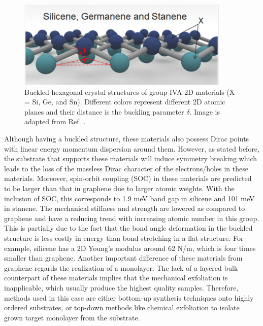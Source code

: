 \begin{figure}[htbp!] 
\centering  
\includegraphics[width=0.9\textwidth]{silicene_structure.png}
\caption[Group IVA 2D materials]{Buckled hexagonal crystal structures of group IVA 2D materials (X = Si, Ge, and Sn). Different colors represent different 2D atomic planes and their distance is the buckling parameter $\delta$. Image is adapted from Ref. \cite{Balendhran2015}.}  
\label{fig:silicene}
\end{figure} 


Although having a buckled structure, these materials also possess Dirac points with linear energy momentum dispersion around them\cite{Garcia2011}.  However, as stated before, the substrate that supports these materials will induce symmetry breaking which leads to the loss of the massless Dirac character of the electrons/holes\cite{Lin2013} in these materials. Moreover, spin-orbit coupling (SOC) in these materials are predicted to be larger than that in graphene due to larger atomic weights. With the inclusion of SOC, this corresponds to 1.9 meV band gap in silicene and 101 meV in stanene\cite{matthes2013}. The mechanical stiffness and strength are lowered as compared to graphene and have a reducing trend with increasing atomic number in this group. This is partially due to the fact that the bond angle deformation in the buckled structure is less costly in energy than bond stretching in a flat structure\cite{Manjanath2014}. For example, silicene has a 2D Young's modulus around 62 \si{N/m}, which is four times smaller than graphene. Another important difference of these materials from graphene regards the realization of a monolayer. The lack of a layered bulk counterpart of these materials implies that the mechanical exfoliation is inapplicable, which usually produce the highest quality samples. Therefore, methods used in this case are either bottom-up synthesis techniques onto highly ordered substrates\cite{vogt2012,Linfei2014}, or top-down methods like chemical exfoliation to isolate grown target monolayer from the substrate\cite{lin2012,kaloni2013}.



